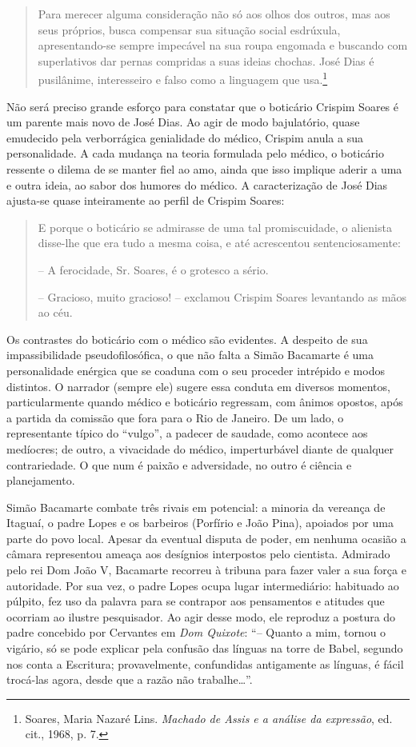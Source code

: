\begin{quote}
Para merecer alguma consideração não só aos olhos dos outros, mas aos
seus próprios, busca compensar sua situação social esdrúxula,
apresentando-se sempre impecável na sua roupa engomada e buscando com
superlativos dar pernas compridas a suas ideias chochas. José Dias é
pusilânime, interesseiro e falso como a linguagem que usa.\footnote{Soares,
  Maria Nazaré Lins. \emph{Machado de Assis e a análise da expressão},
  ed. cit., 1968, p. 7.}
\end{quote}

Não será preciso grande esforço para constatar que o boticário Crispim
Soares é um parente mais novo de José Dias. Ao agir de modo bajulatório,
quase emudecido pela verborrágica genialidade do médico, Crispim anula a
sua personalidade. A cada mudança na teoria formulada pelo médico, o
boticário ressente o dilema de se manter fiel ao amo, ainda que isso
implique aderir a uma e outra ideia, ao sabor dos humores do médico. A
caracterização de José Dias ajusta-se quase inteiramente ao perfil de
Crispim Soares:

\begin{quote}
E porque o boticário se admirasse de uma tal promiscuidade, o alienista
disse-lhe que era tudo a mesma coisa, e até acrescentou
sentenciosamente:

-- A ferocidade, Sr. Soares, é o grotesco a sério.

-- Gracioso, muito gracioso! -- exclamou Crispim Soares levantando as
mãos ao céu.
\end{quote}

Os contrastes do boticário com o médico são evidentes. A despeito de sua
impassibilidade pseudofilosófica, o que não falta a Simão Bacamarte é
uma personalidade enérgica que se coaduna com o seu proceder intrépido e
modos distintos. O narrador (sempre ele) sugere essa conduta em diversos
momentos, particularmente quando médico e boticário regressam, com
ânimos opostos, após a partida da comissão que fora para o Rio de
Janeiro. De um lado, o representante típico do ``vulgo'', a padecer de
saudade, como acontece aos medíocres; de outro, a vivacidade do médico,
imperturbável diante de qualquer contrariedade. O que num é paixão e
adversidade, no outro é ciência e planejamento.

Simão Bacamarte combate três rivais em potencial: a minoria da vereança
de Itaguaí, o padre Lopes e os barbeiros (Porfírio e João Pina),
apoiados por uma parte do povo local. Apesar da eventual disputa de
poder, em nenhuma ocasião a câmara representou ameaça aos desígnios
interpostos pelo cientista. Admirado pelo rei Dom João V, Bacamarte
recorreu à tribuna para fazer valer a sua força e autoridade. Por sua
vez, o padre Lopes ocupa lugar intermediário: habituado ao púlpito, fez
uso da palavra para se contrapor aos pensamentos e atitudes que ocorriam
ao ilustre pesquisador. Ao agir desse modo, ele reproduz a postura do
padre concebido por Cervantes em \emph{Dom Quixote}: ``-- Quanto a mim,
tornou o vigário, só se pode explicar pela confusão das línguas na torre
de Babel, segundo nos conta a Escritura; provavelmente, confundidas
antigamente as línguas, é fácil trocá-las agora, desde que a razão não
trabalhe\ldots{}''.

